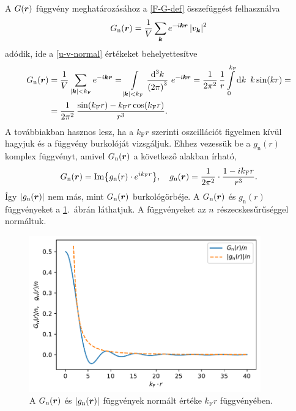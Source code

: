 \documentclass[a4paper,12pt,titlepage]{article}
\newcommand{\KK}{{\vb*{k}}}
\newcommand{\RR}{{\vb*{r}}}
\newcommand{\kF}{{k_\text{F}}}
\begin{document}
A $G(\RR)$ függvény meghatározásához a \eqref{F-G-def} összefüggést felhasználva
\begin{equation}
	G_\text{n}(\RR) = \frac{1}{V} \sum\limits_\KK e^{-i \KK \RR} \left| v_\KK \right|^2
\end{equation}
adódik, ide a \eqref{u-v-normal} értékeket behelyettesítve
\begin{equation}
\begin{split}
	G_\text{n}(\RR) & = \frac{1}{V} \sum\limits_{\left| \KK \right| < \kF} e^{-i \KK \RR} = \int\limits_{\left| \KK \right| < \kF} \frac{\dd[3]k}{\left( 2 \pi \right)^3} ~ e^{-i \KK \RR} = \frac{1}{2 \pi^2} \, \frac{1}{r} \int\limits_0^{\kF} \dd{k} ~ k \sin(k r) = \\
	& = \frac{1}{2 \pi^2} \, \frac{\sin(\kF r) - \kF r \cos(\kF r)}{r^3}.
\end{split}
\end{equation}
A továbbiakban hasznos lesz, ha a $\kF r$ szerinti oszcillációt figyelmen kívül hagyjuk és a függvény burkolóját vizsgáljuk.  Ehhez vezessük be a $g_\text{n}(r)$ komplex függvényt, amivel $G_\text{n}(\RR)$ a következő alakban írható,
\begin{equation}
	G_\text{n}(\RR) = \Im{g_\text{n}(r) \cdot e^{i \kF r}}, ~~~ g_\text{n}(\RR) = \frac{1}{2 \pi^2} \cdot \frac{1 - i \kF r}{r^3}.
\end{equation}
Így $\left| g_\text{n}(\RR) \right|$ nem más, mint $G_\text{n}(\RR)$ burkológörbéje.  A $G_\text{n}(\RR)$ és $g_\text{n}(r)$ függvényeket a \ref{G-normal-fig}.\ ábrán láthatjuk.  A függvényeket az $n$ részecskesűrűséggel normáltuk.
\begin{figure}[h!]
	\centering
	\includegraphics[width=10cm]{G_normal.pdf}
	\caption{A $G_\text{n}(\RR)$ és $\left| g_\text{n}(\RR) \right|$ függvények normált értéke $\kF r$ függvényében.}
	\label{G-normal-fig}
\end{figure}
\end{document}

